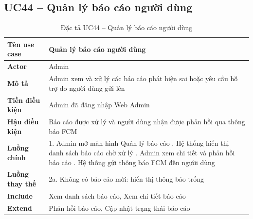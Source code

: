 \subsection*{UC44 -- Quản lý báo cáo người dùng}
\begin{table}[H]
    \captionsetup{justification=raggedright, singlelinecheck=false}
    \caption{Đặc tả UC44 -- Quản lý báo cáo người dùng}
\centering
\begin{tabular}{|p{3.5cm}|p{10cm}|}
\hline
\textbf{Tên use case} & Quản lý báo cáo người dùng \\
\hline
\textbf{Actor} & Admin \\
\hline
\textbf{Mô tả} & Admin xem và xử lý các báo cáo phát hiện
  sai hoặc yêu cầu hỗ trợ do người dùng gửi lên \\
\hline
\textbf{Tiền điều kiện} & Admin đã đăng nhập Web Admin \\
\hline
\textbf{Hậu điều kiện} & Báo cáo được xử lý và người dùng
  nhận được phản hồi qua thông báo FCM \\
\hline
\textbf{Luồng chính} &
  1. Admin mở màn hình Quản lý báo cáo \newline
  2. Hệ thống hiển thị danh sách báo cáo chờ xử lý \newline
  3. Admin xem chi tiết và phản hồi báo cáo \newline
  4. Hệ thống gửi thông báo FCM đến người dùng \\
\hline
\textbf{Luồng thay thế} &
  2a. Không có báo cáo mới: hiển thị thông báo trống \\
\hline
\textbf{Include} & Xem danh sách báo cáo,
  Xem chi tiết báo cáo \\
\hline
\textbf{Extend} & Phản hồi báo cáo,
  Cập nhật trạng thái báo cáo \\
\hline
\end{tabular}

\end{table}

